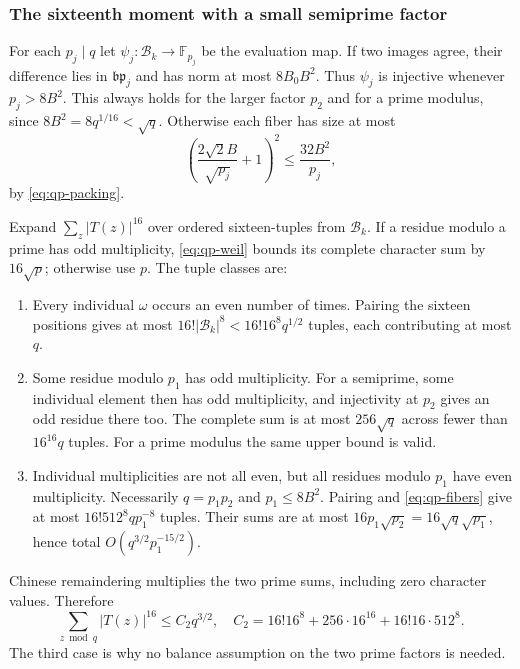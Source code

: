 \subsubsection{The sixteenth moment with a small semiprime factor}

For each $p_j\mid q$ let
$\psi_j:\mathcal B_k\longrightarrow\mathbb F_{p_j}$ be the
evaluation map.  If two images agree, their difference lies in
$\mathfrak b\mathfrak p_j$ and has norm at most $8B_0B^2$.
Thus $\psi_j$ is injective whenever $p_j>8B^2$.  This always holds
for the larger factor $p_2$ and for a prime modulus, since
$8B^2=8q^{1/16}<\sqrt q$.  Otherwise each fiber has size at most
\begin{equation}
 \left(\frac{2\sqrt2 B}{\sqrt{p_j}}+1\right)^2
 \leq\frac{32B^2}{p_j},
 \label{eq:qp-fibers}
\end{equation}
by \eqref{eq:qp-packing}.

Expand $\sum_z|T(z)|^{16}$ over ordered sixteen-tuples from
$\mathcal B_k$.  If a residue modulo a prime has odd multiplicity,
\eqref{eq:qp-weil} bounds its complete character sum by $16\sqrt p$;
otherwise use $p$.  The tuple classes are:
\begin{enumerate}
\item Every individual $\omega$ occurs an even number of times.
Pairing the sixteen positions gives at most
$16!|\mathcal B_k|^8<16!16^8q^{1/2}$ tuples, each contributing at most
$q$.
\item Some residue modulo $p_1$ has odd multiplicity.
For a semiprime, some individual element then has odd multiplicity,
and injectivity at $p_2$ gives an odd residue there too.  The complete
sum is at most $256\sqrt q$ across fewer than $16^{16}q$ tuples.
For a prime modulus the same upper bound is valid.
\item Individual multiplicities are not all even, but all residues
modulo $p_1$ have even multiplicity.  Necessarily
$q=p_1p_2$ and $p_1\leq8B^2$.  Pairing and \eqref{eq:qp-fibers}
give at most $16!512^8q p_1^{-8}$ tuples.  Their sums are at most
$16p_1\sqrt{p_2}=16\sqrt q\sqrt{p_1}$, hence total
$O(q^{3/2}p_1^{-15/2})$.
\end{enumerate}
Chinese remaindering multiplies the two prime sums, including zero
character values.  Therefore
\begin{equation}
 \sum_{z\bmod q}|T(z)|^{16}\leq C_2q^{3/2},
 \quad C_2=16!16^8+256\cdot16^{16}+16!16\cdot512^8.
 \label{eq:qp-sixteenth}
\end{equation}
The third case is why no balance assumption on the two prime factors
is needed.

